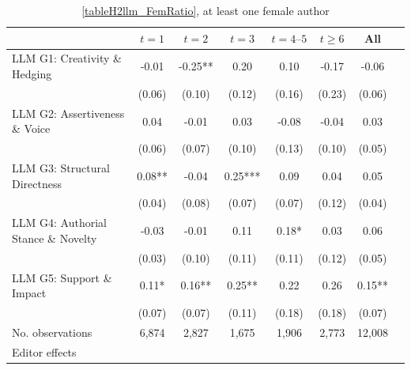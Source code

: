 \begin{table}
    \footnotesize
    \centering
    \begin{threeparttable}
        \caption{\autoref{tableH2llm_FemRatio}, at least one female author}
        \label{tableH2llm_Fem1}
        \begin{tabular}{p{3cm}S@{}S@{}S@{}S@{}S@{}S@{}S@{}}
            \toprule
            &{\(t=1\)}&{\(t=2\)}&{\(t=3\)}&{\(t=4\text{--}5\)}&{\(t\ge6\)}&{All}\\
            \midrule
            LLM G1: Creativity \& Hedging &       -0.01   &       -0.25** &        0.20   &        0.10   &       -0.17   &       -0.06   \\
                                          &      (0.06)   &      (0.10)   &      (0.12)   &      (0.16)   &      (0.23)   &      (0.06)   \\
            LLM G2: Assertiveness \& Voice&        0.04   &       -0.01   &        0.03   &       -0.08   &       -0.04   &        0.03   \\
                                          &      (0.06)   &      (0.07)   &      (0.10)   &      (0.13)   &      (0.10)   &      (0.05)   \\
            LLM G3: Structural Directness &        0.08** &       -0.04   &        0.25***&        0.09   &        0.04   &        0.05   \\
                                          &      (0.04)   &      (0.08)   &      (0.07)   &      (0.07)   &      (0.12)   &      (0.04)   \\
            LLM G4: Authorial Stance \& Novelty&       -0.03   &       -0.01   &        0.11   &        0.18*  &        0.03   &        0.06   \\
                                          &      (0.03)   &      (0.10)   &      (0.11)   &      (0.11)   &      (0.12)   &      (0.05)   \\
            LLM G5: Support \& Impact     &        0.11*  &        0.16** &        0.25** &        0.22   &        0.26   &        0.15** \\
                                          &      (0.07)   &      (0.07)   &      (0.11)   &      (0.18)   &      (0.18)   &      (0.07)   \\
            \midrule
            No. observations              &       6,874   &       2,827   &       1,675   &       1,906   &       2,773   &      12,008   \\
            \midrule
Editor effects        &           {}   &           {}   &           {}   &           {}   &           {}   &           {}   \\

\end{tabular}
\end{threeparttable}
\end{table}
